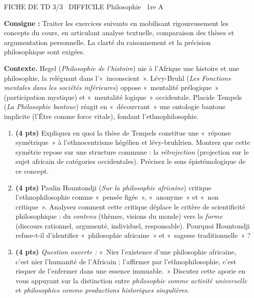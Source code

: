 \documentclass[11pt]{article}
\begin{document}
\begin{tcolorbox}[enhanced,colback=popink,colframe=popink,arc=10pt,boxrule=0pt,left=12pt,right=12pt,top=9pt,bottom=9pt]
{\color{white}\popxbold\small FICHE DE TD 3/3 \textbullet\ DIFFICILE \hfill Philosophie \textbullet\ 1re A\par}
\end{tcolorbox}
\vspace{4pt}
\noindent \textbf{Consigne :} Traiter les exercices suivants en mobilisant rigoureusement les concepts du cours, en articulant analyse textuelle, comparaison des thèses et argumentation personnelle. La clarté du raisonnement et la précision philosophique sont exigées.

\begin{exercice}
\textbf{Contexte.} Hegel (\textit{Philosophie de l'histoire}) nie à l'Afrique une histoire et une philosophie, la reléguant dans l'«~inconscient~». Lévy-Bruhl (\textit{Les Fonctions mentales dans les sociétés inférieures}) oppose «~mentalité prélogique~» (participation mystique) et «~mentalité logique~» occidentale. Placide Tempels (\textit{La Philosophie bantoue}) réagit en «~découvrant~» une ontologie bantoue implicite (l'Être comme force vitale), fondant l'ethnophilosophie.

\begin{enumerate}
    \item \textbf{(4 pts)} Expliquez en quoi la thèse de Tempels constitue une «~réponse symétrique~» à l'ethnocentrisme hégélien et lévy-bruhlrien. Montrez que cette symétrie repose sur une structure commune : la \textit{rétrojection} (projection sur le sujet africain de catégories occidentales). Précisez le sens épistémologique de ce concept.
    \item \textbf{(4 pts)} Paulin Hountondji (\textit{Sur la philosophie africaine}) critique l'ethnophilosophie comme «~pensée figée~», «~anonyme~» et «~non critique~». Analysez comment cette critique déplace le critère de scientificité philosophique : du \textit{contenu} (thèmes, visions du monde) vers la \textit{forme} (discours rationnel, argumenté, individuel, responsable). Pourquoi Hountondji refuse-t-il d'identifier «~philosophie africaine~» et «~sagesse traditionnelle~» ?
    \item \textbf{(4 pts)} \textit{Question ouverte :} «~Nier l'existence d'une philosophie africaine, c'est nier l'humanité de l'Africain ; l'affirmer par l'ethnophilosophie, c'est risquer de l'enfermer dans une essence immuable.~» Discutez cette aporie en vous appuyant sur la distinction entre \textit{philosophie comme activité universelle} et \textit{philosophies comme productions historiques singulières}.
\end{enumerate}
\end{exercice}
\end{document}
